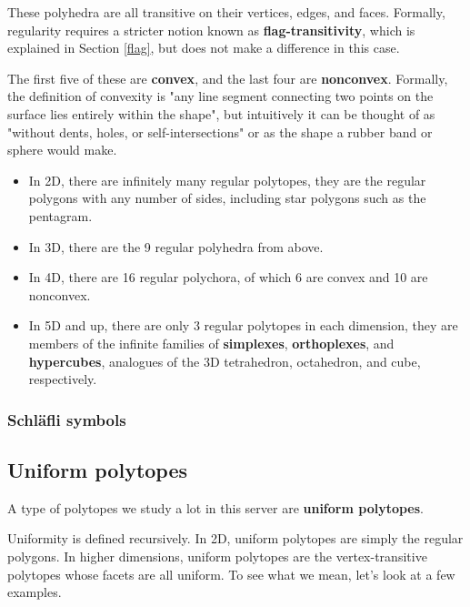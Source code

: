 \documentclass{article}
\begin{document}
These polyhedra are all transitive on their vertices, edges, and faces. Formally, regularity
requires a stricter notion known as \textbf{flag-transitivity}, which is explained in Section \ref{flag},
but does not make a difference in this case.

The first five of these are \textbf{convex}, and the last four are \textbf{nonconvex}. Formally,
the definition of convexity is "any line segment connecting two points on the surface lies entirely
within the shape", but intuitively it can be thought of as "without dents, holes, or self-intersections"
or as the shape a rubber band or sphere would make.

\begin{itemize}
\item In 2D, there are infinitely many regular polytopes, they are the regular polygons with any number of
sides, including star polygons such as the pentagram.
\item In 3D, there are the 9 regular polyhedra from above.
\item In 4D, there are 16 regular polychora, of which 6 are convex and 10 are nonconvex.
\item In 5D and up, there are only 3 regular polytopes in each dimension, they are members of the
infinite families of \textbf{simplexes}, \textbf{orthoplexes}, and \textbf{hypercubes}, analogues of
the 3D tetrahedron, octahedron, and cube, respectively.
\end{itemize}

\subsubsection{Schläfli symbols}

\subsection{Uniform polytopes}
A type of polytopes we study a lot in this server are \textbf{uniform polytopes}.

Uniformity is defined recursively. In 2D, uniform polytopes are simply the regular polygons.
In higher dimensions, uniform polytopes are the vertex-transitive polytopes whose facets are all uniform. To see what we mean, let's look at a few examples.
\end{document}
